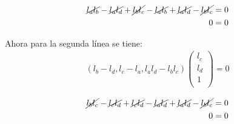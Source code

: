 \begin{align*}
\cancel{l_a l_b} -\cancel{l_a l_d} + \cancel{l_b l_c} - \cancel{l_a l_b} + \cancel{l_a l_d} - \cancel{l_b l_c} &=0\\
0 &= 0
\end{align*} 

Ahora para la segunda línea se tiene:
\begin{align*}
(l_b -l_d,    l_c -l_a ,    l_a l_d - l_b l_c )
\begin{pmatrix}
    l_c \\
    l_d \\
    1 \\
\end{pmatrix}
= 0
\end{align*} 

\begin{align*}
\cancel{l_b l_c} -\cancel{l_c l_d} + \cancel{l_c l_d} - \cancel{l_a l_d} + \cancel{l_a l_d} - \cancel{l_b l_c} &=0\\
0 &= 0
\end{align*} 


